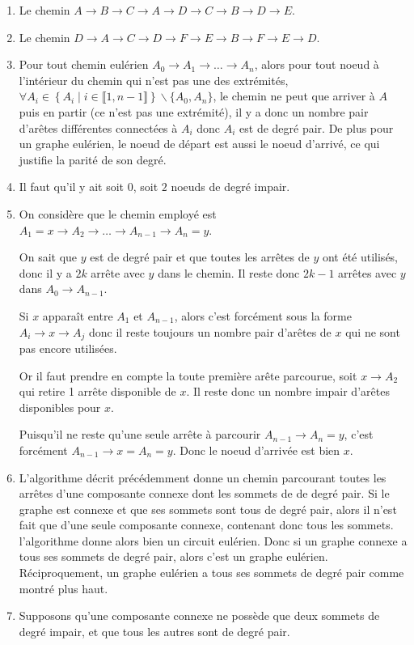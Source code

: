 \documentclass[a4paper,french,bookmarks]{article}
\begin{document}

\begin{enumerate}
    \item Le chemin $A \to B \to C \to A \to D \to C \to B \to D \to E$.
    
    \item Le chemin $D \to A \to C \to D \to F \to E \to B \to F \to E \to D$.
    
    \item Pour tout chemin eulérien $A_0 \to A_1 \to \dots \to A_n$, alors pour tout noeud à l'intérieur du chemin qui n'est pas une des extrémités, \ie $\forall A_i \in \left\{A_i \middle\vert i \in \llbracket 1, n-1\rrbracket\right\} \backslash \{ A_0, A_n \}$, le chemin ne peut que arriver à $A$ puis en partir (ce n'est pas une extrémité), il y a donc un nombre pair d'arêtes différentes connectées à $A_i$ donc $A_i$ est de degré pair. De plus pour un graphe eulérien, le noeud de départ est aussi le noeud d'arrivé, ce qui justifie la parité de son degré.
    
    \item Il faut qu'il y ait soit $0$, soit $2$ noeuds de degré impair.
    
    \item On considère que le chemin employé est $A_1 = x \to A_2 \to \dots \to A_{n-1} \to A_n = y$.
    
    On sait que $y$ est de degré pair et que toutes les arrêtes de $y$ ont été utilisés, donc il y a $2k$ arrête avec $y$ dans le chemin. Il reste donc $2k-1$ arrêtes avec $y$ dans $A_0 \to A_{n-1}$.
    
    Si $x$ apparaît entre $A_1$ et $A_{n-1}$, alors c'est forcément sous la forme $A_i \to x \to A_j$ donc il reste toujours un nombre pair d'arêtes de $x$ qui ne sont pas encore utilisées.
    
    Or il faut prendre en compte la toute première arête parcourue, soit $x \to A_2$ qui retire 1 arrête disponible de $x$. Il reste donc un nombre impair d'arêtes disponibles pour $x$.
    
    Puisqu'il ne reste qu'une seule arrête à parcourir $A_{n-1} \to A_n = y$, c'est forcément $A_{n-1} \to x = A_n = y$. Donc le noeud d'arrivée est bien $x$.
    
    \item L'algorithme décrit précédemment donne un chemin parcourant toutes les arrêtes d'une composante connexe dont les sommets de de degré pair. Si le graphe est connexe et que ses sommets sont tous de degré pair, alors il n'est fait que d'une seule composante connexe, contenant donc tous les sommets. l'algorithme donne alors bien un circuit eulérien. Donc si un graphe connexe a tous ses sommets de degré pair, alors c'est un graphe eulérien. Réciproquement, un graphe eulérien a tous ses sommets de degré pair comme montré plus haut.
    
    \item Supposons qu'une composante connexe ne possède que deux sommets de degré impair, et que tous les autres sont de degré pair.
\end{enumerate}
\end{document}
